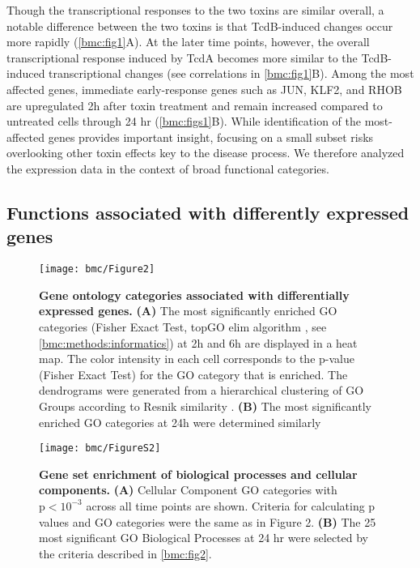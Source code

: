 Though the transcriptional responses to the two toxins 
are similar overall, a notable difference between the 
two toxins is that TcdB-induced changes occur more 
rapidly (\autoref{bmc:fig1}A). At the later time points, 
however, the overall transcriptional response induced by 
TcdA becomes more similar to the TcdB-induced transcriptional 
changes (see correlations in \autoref{bmc:fig1}B). Among 
the most affected genes, immediate early-response genes 
such as JUN, KLF2, and RHOB are upregulated 2h after toxin 
treatment and remain increased compared to untreated cells 
through 24 hr (\autoref{bmc:figs1}B). While identification 
of the most-affected genes provides important insight, 
focusing on a small subset risks overlooking other toxin 
effects key to the disease process. We therefore analyzed 
the expression data in the context of broad functional categories.

\subsection{Functions associated with differently expressed genes}

\begin{figure}[h!]
  \centering
  \texttt{[image: bmc/Figure2]}
  \caption[Gene ontology categories associated with differentially expressed genes]{
  \textbf{Gene ontology categories associated with differentially expressed genes.}
  \textbf{(A)} The most significantly enriched GO categories 
  (Fisher Exact Test, topGO elim algorithm \cite{Alexa:2006hg}, 
  see \ref{bmc:methods:informatics}) at 2h and 6h are displayed 
  in a heat map. The color intensity in each cell corresponds to 
  the p-value (Fisher Exact Test) for the GO category that is 
  enriched. The dendrograms were generated from a hierarchical 
  clustering of GO Groups according to Resnik similarity \cite{Resnik:1999jl}.
  \textbf{(B)} The most significantly enriched GO 
  categories at 24h were determined similarly
}
  \label{bmc:fig2}
\end{figure}

\begin{sidewaysfigure}
  \centering
  \texttt{[image: bmc/FigureS2]}
  \caption[Gene set enrichment of biological processes and cellular components]{
  \textbf{Gene set enrichment of biological processes 
  and cellular components.}
  \textbf{(A)} Cellular Component GO categories 
  with $\text{p}<10^{-3}$ across all time points 
  are shown. Criteria for calculating p
  values and GO categories were the same 
  as in Figure 2.
  \textbf{(B)} The 25 most significant GO 
  Biological Processes at 24 hr were selected 
  by the criteria described in \autoref{bmc:fig2}.}
  \label{bmc:figs2}
\end{sidewaysfigure}

